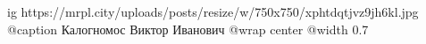  
 
 
 
 

\ifcmt
  ig https://mrpl.city/uploads/posts/resize/w/750x750/xphtdqtjvz9jh6kl.jpg
	@caption Калогномос Виктор Иванович
  @wrap center
  @width 0.7
\fi
